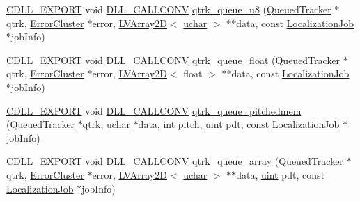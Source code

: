 \begin{DoxyCompactItemize}
\item 
\hyperlink{dllmacros_8h_af97e4004759ff877db017c3d1a855482}{C\+D\+L\+L\+\_\+\+E\+X\+P\+O\+RT} void \hyperlink{dllmacros_8h_a6596c37c55424b395798708344d63791}{D\+L\+L\+\_\+\+C\+A\+L\+L\+C\+O\+NV} \hyperlink{group__lab___a_p_i_ga51dc3794c2a053752e586b5c24ffa399}{qtrk\+\_\+queue\+\_\+u8} (\hyperlink{class_queued_tracker}{Queued\+Tracker} $\ast$qtrk, \hyperlink{struct_error_cluster}{Error\+Cluster} $\ast$error, \hyperlink{struct_l_v_array2_d}{L\+V\+Array2D}$<$ \hyperlink{std__incl_8h_a65f85814a8290f9797005d3b28e7e5fc}{uchar} $>$ $\ast$$\ast$data, const \hyperlink{struct_localization_job}{Localization\+Job} $\ast$job\+Info)
\item 
\hyperlink{dllmacros_8h_af97e4004759ff877db017c3d1a855482}{C\+D\+L\+L\+\_\+\+E\+X\+P\+O\+RT} void \hyperlink{dllmacros_8h_a6596c37c55424b395798708344d63791}{D\+L\+L\+\_\+\+C\+A\+L\+L\+C\+O\+NV} \hyperlink{group__lab___a_p_i_ga4e6c67bd7420373f0d1ca30520019b3b}{qtrk\+\_\+queue\+\_\+float} (\hyperlink{class_queued_tracker}{Queued\+Tracker} $\ast$qtrk, \hyperlink{struct_error_cluster}{Error\+Cluster} $\ast$error, \hyperlink{struct_l_v_array2_d}{L\+V\+Array2D}$<$ float $>$ $\ast$$\ast$data, const \hyperlink{struct_localization_job}{Localization\+Job} $\ast$job\+Info)
\item 
\hyperlink{dllmacros_8h_af97e4004759ff877db017c3d1a855482}{C\+D\+L\+L\+\_\+\+E\+X\+P\+O\+RT} void \hyperlink{dllmacros_8h_a6596c37c55424b395798708344d63791}{D\+L\+L\+\_\+\+C\+A\+L\+L\+C\+O\+NV} \hyperlink{group__lab___a_p_i_ga3ea977368ebc35640b91a056e8acf7c1}{qtrk\+\_\+queue\+\_\+pitchedmem} (\hyperlink{class_queued_tracker}{Queued\+Tracker} $\ast$qtrk, \hyperlink{std__incl_8h_a65f85814a8290f9797005d3b28e7e5fc}{uchar} $\ast$data, int pitch, \hyperlink{std__incl_8h_a91ad9478d81a7aaf2593e8d9c3d06a14}{uint} pdt, const \hyperlink{struct_localization_job}{Localization\+Job} $\ast$job\+Info)
\item 
\hyperlink{dllmacros_8h_af97e4004759ff877db017c3d1a855482}{C\+D\+L\+L\+\_\+\+E\+X\+P\+O\+RT} void \hyperlink{dllmacros_8h_a6596c37c55424b395798708344d63791}{D\+L\+L\+\_\+\+C\+A\+L\+L\+C\+O\+NV} \hyperlink{group__lab___a_p_i_gae6bcb1bb836ef522f989df4e9fc1a70a}{qtrk\+\_\+queue\+\_\+array} (\hyperlink{class_queued_tracker}{Queued\+Tracker} $\ast$qtrk, \hyperlink{struct_error_cluster}{Error\+Cluster} $\ast$error, \hyperlink{struct_l_v_array2_d}{L\+V\+Array2D}$<$ \hyperlink{std__incl_8h_a65f85814a8290f9797005d3b28e7e5fc}{uchar} $>$ $\ast$$\ast$data, \hyperlink{std__incl_8h_a91ad9478d81a7aaf2593e8d9c3d06a14}{uint} pdt, const \hyperlink{struct_localization_job}{Localization\+Job} $\ast$job\+Info)
$$
\end{DoxyCompactItemize}
